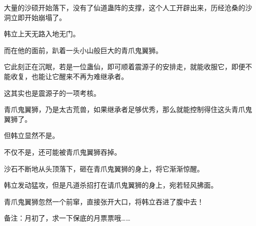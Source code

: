 \begin{this_body}
大量的沙硕开始落下，没有了仙道蛊阵的支撑，这个人工开辟出来，历经沧桑的沙洞立即开始崩塌了。

韩立上天无路入地无门。

而在他的面前，趴着一头小山般巨大的青爪鬼翼狮。

它此刻正在沉眠，若是一位蛊仙，即可顺着震源子的安排走，就能收服它，即便不能收复，也能让它醒来不再为难继承者。

这其实也是震源子的一项考核。

青爪鬼翼狮，乃是太古荒兽，如果继承者足够优秀，那么就能控制得住这头青爪鬼翼狮了。

但韩立显然不是。

不仅不是，还可能被青爪鬼翼狮吞掉。

沙石不断地从头顶落下，砸在青爪鬼翼狮的身上，将它渐渐惊醒。

韩立发动猛攻，但是凡道杀招打在请爪鬼翼狮的身上，宛若轻风拂面。

青爪鬼翼狮忽然一个前窜，直接张开大口，将韩立吞进了腹中去！

备注：月初了，求一下保底的月票票哦……

\end{this_body}

